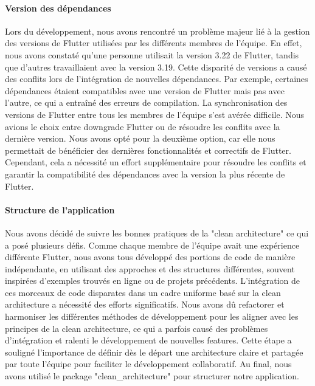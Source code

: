 \paragraph{Version des dépendances} Lors du développement, nous avons rencontré un problème majeur lié à la gestion des versions de Flutter utilisées par les différents membres de l'équipe. En effet, nous avons constaté qu'une personne utilisait la version 3.22 de Flutter, tandis que d'autres travaillaient avec la version 3.19. Cette disparité de versions a causé des conflits lors de l'intégration de nouvelles dépendances. Par exemple, certaines dépendances étaient compatibles avec une version de Flutter mais pas avec l'autre, ce qui a entraîné des erreurs de compilation. La synchronisation des versions de Flutter entre tous les membres de l'équipe s'est avérée difficile. Nous avions le choix entre downgrade Flutter ou de résoudre les conflits avec la dernière version. Nous avons opté pour la deuxième option, car elle nous permettait de bénéficier des dernières fonctionnalités et correctifs de Flutter. Cependant, cela a nécessité un effort supplémentaire pour résoudre les conflits et garantir la compatibilité des dépendances avec la version la plus récente de Flutter.

\paragraph{Structure de l'application} Nous avons décidé de suivre les bonnes pratiques de la "clean architecture" ce qui a posé plusieurs défis. Comme chaque membre de l'équipe avait une expérience différente Flutter, nous avons tous développé des portions de code de manière indépendante, en utilisant des approches et des structures différentes, souvent inspirées d'exemples trouvés en ligne ou de projets précédents. L'intégration de ces morceaux de code disparates dans un cadre uniforme basé sur la clean architecture a nécessité des efforts significatifs. Nous avons dû refactorer et harmoniser les différentes méthodes de développement pour les aligner avec les principes de la clean architecture, ce qui a parfois causé des problèmes d'intégration et ralenti le développement de nouvelles features. Cette étape a souligné l'importance de définir dès le départ une architecture claire et partagée par toute l'équipe pour faciliter le développement collaboratif. Au final, nous avons utilisé le package "clean\_architecture" pour structurer notre application.


